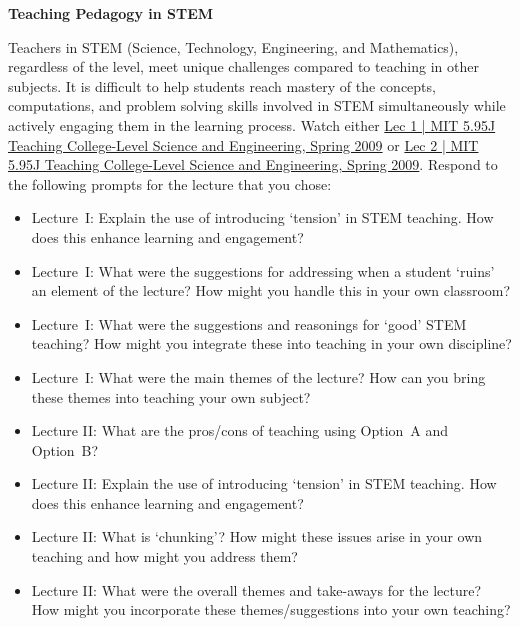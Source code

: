 \documentclass[11pt,letterpaper]{article}
\begin{document}

\begin{center} {\Large \bfseries Teaching Pedagogy in STEM} \end{center}

Teachers in STEM (Science, Technology, Engineering, and Mathematics), regardless of the level, meet unique challenges compared to teaching in other subjects. It is difficult to help students reach mastery of the concepts, computations, and problem solving skills involved in STEM simultaneously while actively engaging them in the learning process. Watch either \href{https://www.youtube.com/watch?v=wy-LqFDwMuM&list=PLB1304385546D6F86&index=2&ab_channel=MITOpenCourseWare}{Lec 1 | MIT 5.95J Teaching College-Level Science and Engineering, Spring 2009} or \href{https://www.youtube.com/watch?v=gyboshu425k&list=PLB1304385546D6F86&index=4&ab_channel=MITOpenCourseWare}{Lec 2 | MIT 5.95J Teaching College-Level Science and Engineering, Spring 2009}. Respond to the following prompts for the lecture that you chose:
	\begin{itemize}
	\item Lecture~I: Explain the use of introducing `tension' in STEM teaching. How does this enhance learning and engagement?
	\item Lecture~I: What were the suggestions for addressing when a student `ruins' an element of the lecture? How might you handle this in your own classroom?
	\item Lecture~I: What were the suggestions and reasonings for `good' STEM teaching? How might you integrate these into teaching in your own discipline? 
	\item Lecture~I: What were the main themes of the lecture? How can you bring these themes into teaching your own subject?
	\item Lecture II: What are the pros/cons of teaching using Option~A and Option~B?
	\item Lecture II: Explain the use of introducing `tension' in STEM teaching. How does this enhance learning and engagement?
	\item Lecture II: What is `chunking'? How might these issues arise in your own teaching and how might you address them?
	\item Lecture II: What were the overall themes and take-aways for the lecture? How might you incorporate these themes/suggestions into your own teaching?
	\end{itemize}

\newpage

\phantom{.}
\end{document}
